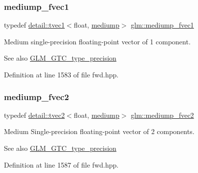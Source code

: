 \subsubsection{\texorpdfstring{mediump\+\_\+fvec1}{mediump\_fvec1}}
{\footnotesize\ttfamily typedef \hyperlink{structglm_1_1detail_1_1tvec1}{detail\+::tvec1}$<$float, \hyperlink{namespaceglm_a0f04f086094c747d227af4425893f545a6416f3ea0c9025fb21ed50c4d6620482}{mediump}$>$ \hyperlink{group__gtc__type__precision_ga4534af301d5260974cee29f76842d579}{glm\+::mediump\+\_\+fvec1}}

Medium single-\/precision floating-\/point vector of 1 component. \begin{DoxySeeAlso}{See also}
\hyperlink{group__gtc__type__precision}{G\+L\+M\+\_\+\+G\+T\+C\+\_\+type\+\_\+precision} 
\end{DoxySeeAlso}


Definition at line 1583 of file fwd.\+hpp.

\mbox{\label{group__gtc__type__precision_ga5c2686caa6838515f6727eea1b64aa05}} 
\subsubsection{\texorpdfstring{mediump\+\_\+fvec2}{mediump\_fvec2}}
{\footnotesize\ttfamily typedef \hyperlink{structglm_1_1detail_1_1tvec2}{detail\+::tvec2}$<$float, \hyperlink{namespaceglm_a0f04f086094c747d227af4425893f545a6416f3ea0c9025fb21ed50c4d6620482}{mediump}$>$ \hyperlink{group__gtc__type__precision_ga5c2686caa6838515f6727eea1b64aa05}{glm\+::mediump\+\_\+fvec2}}

Medium Single-\/precision floating-\/point vector of 2 components. \begin{DoxySeeAlso}{See also}
\hyperlink{group__gtc__type__precision}{G\+L\+M\+\_\+\+G\+T\+C\+\_\+type\+\_\+precision} 
\end{DoxySeeAlso}


Definition at line 1587 of file fwd.\+hpp.

\mbox{\label{group__gtc__type__precision_ga710c3af5ebb05e5e863cff78affd25a6}} 
